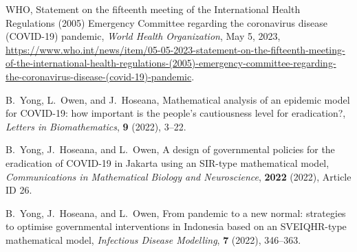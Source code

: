 \documentclass[11pt,reqno]{amsart}
\begin{document}
\begin{thebibliography}{99}

     WHO,
     \newblock Statement on the fifteenth meeting of the International Health Regulations (2005) Emergency Committee regarding the coronavirus disease (COVID-19) pandemic,
     \newblock \emph{World Health Organization}, May 5, 2023, \ul{https://www.who.int/news/item/05-05-2023-statement-on-the-fifteenth-meeting-of-the-\linebreak international-health-regulations-(2005)-emergency-committee-regarding-the-coronavirus-disease-(covid-19)-pandemic}.

     B.\ Yong, L.\ Owen, and J.\ Hoseana,
     \newblock Mathematical analysis of an epidemic model for COVID-19: how important is the people's cautiousness level for eradication?,
     \newblock \emph{Letters in Biomathematics}, \textbf{9} (2022), 3--22.

     B.\ Yong, J.\ Hoseana, and L.\ Owen,
     \newblock A design of governmental policies for the eradication of COVID-19 in Jakarta using an SIR-type mathematical model,
     \newblock \emph{Communications in Mathematical Biology and Neuroscience}, \textbf{2022} (2022), Article ID 26.

     B.\ Yong, J.\ Hoseana, and L.\ Owen,
     \newblock From pandemic to a new normal: strategies to optimise governmental interventions in Indonesia based on an SVEIQHR-type mathematical model,
     \newblock \emph{Infectious Disease Modelling}, \textbf{7} (2022), 346--363.
\end{thebibliography}
\end{document}
